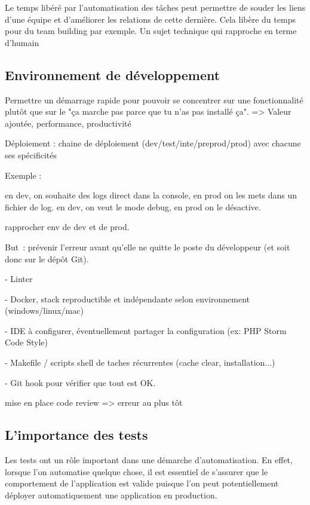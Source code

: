 Le temps libéré par l'automatisation des tâches peut permettre de souder les liens d'une équipe et d'améliorer les relations de cette dernière. Cela libère du temps pour du team building par exemple. Un sujet technique qui rapproche en terme d'humain

\subsection{Environnement de développement}


Permettre un démarrage rapide pour pouvoir se concentrer sur une fonctionnalité plutôt que sur le "ça marche pas parce que tu n’as pas installé ça". => Valeur ajoutée, performance, productivité

Déploiement : chaine de déploiement (dev/test/inte/preprod/prod) avec chacune ses spécificités

Exemple :

en dev, on souhaite des logs direct dans la console, en prod on les mets dans un fichier de log.
en dev, on veut le mode debug, en prod on le désactive.

rapprocher env de dev et de prod.

But : prévenir l'erreur avant qu'elle ne quitte le poste du développeur (et soit donc sur le dépôt Git).

-  Linter

-  Docker, stack reproductible et indépendante selon environnement (windows/linux/mac) 

- IDE à configurer, éventuellement partager la configuration (ex: PHP Storm Code Style)

-  Makefile / scripts shell de taches récurrentes (cache clear, installation...)

- Git hook pour vérifier que tout est OK.

mise en place code review => erreur au plus tôt

\subsection{L'importance des tests} \label{importance-test}

Les tests ont un rôle important dans une démarche d'automatisation. En effet, lorsque l'on automatise quelque chose, il est essentiel de s'assurer que le comportement de l'application est valide puisque l'on peut potentiellement déployer automatiquement une application en production. 

